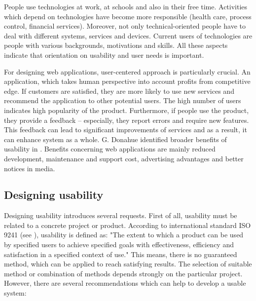 \documentclass[graybox]{svmult}
\begin{document}
People use technologies at work, at schools and also in their free time.
Activities which depend on technologies have become more responsible (health
care, process control, financial services). Moreover, not only
technical-oriented people have to deal with different systems, services and
devices. Current users of technologies are people with various backgrounds,
motivations and skills. All these aspects indicate that orientation on
usability and user needs is important.

For designing web applications, user-centered approach is particularly
crucial. An application, which takes human perspective into account profits
from competitive edge. If customers are satisfied, they are more likely to use
new services and recommend the application to other potential users. The high
number of users indicates high popularity of the product. Furthermore, if
people use the product, they provide a feedback -- especially, they report
errors and require new features. This feedback can lead to significant
improvements of services and as a result, it can enhance system as a whole.
G. Donahue identified broader benefits of usability in
\cite{donahue2001usability}. Benefits concerning web applications are mainly
reduced development, maintenance and support cost, advertising advantages and
better notices in media.

\subsection{Designing usability}
Designing usability introduces several requests. First of all, usability must
be related to a concrete project or product. According to international
standard ISO 9241 (see \cite{iso9241-11}), usability is defined as: "The
extent to which a product can be used by specified users to achieve specified
goals with effectiveness, efficiency and satisfaction in a specified context
of use." This means, there is no guaranteed method, which can be applied to
reach satisfying results. The selection of suitable method or combination of
methods depends strongly on the particular project. However, there are several
recommendations which can help to develop a usable system:
\end{document}
